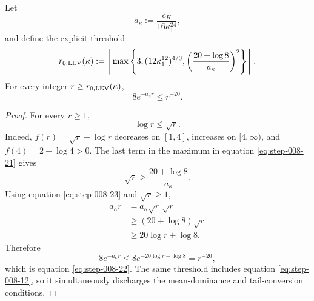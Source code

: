 \begin{lemma}
\label{lem:step-008-tail-conversion}
Let
\begin{equation}
  a_\kappa:=\frac{c_H}{16\kappa_1^{24}},                   \label{eq:step-008-20}
\end{equation}
and define the explicit threshold
\begin{equation}
  r_{0,\rm LEV}(\kappa)
  :=\left\lceil
    \max\left\{
      3,
      (12\kappa_1^{12})^{4/3},
      \left(\frac{20+\log8}{a_\kappa}\right)^2
    \right\}
  \right\rceil.                                            \label{eq:step-008-21}
\end{equation}
For every integer \(r\ge r_{0,\rm LEV}(\kappa)\),
\begin{equation}
  8e^{-a_\kappa r}\le r^{-20}.                             \label{eq:step-008-22}
\end{equation}

\end{lemma}

\begin{proof}
For every \(r\ge1\),
\begin{equation}
  \log r\le\sqrt r.                                       \label{eq:step-008-23}
\end{equation}
Indeed, \(f(r)=\sqrt r-\log r\) decreases on \([1,4]\), increases on
\([4,\infty)\), and \(f(4)=2-\log4>0\). The last term in the maximum in
equation \eqref{eq:step-008-21} gives
\[
  \sqrt r\ge\frac{20+\log8}{a_\kappa}.
\]
Using equation \eqref{eq:step-008-23} and \(\sqrt r\ge1\),
\begin{equation}
\begin{aligned}
  a_\kappa r
  &=a_\kappa\sqrt r\,\sqrt r\\
  &\ge(20+\log8)\sqrt r\\
  &\ge20\log r+\log8.
\end{aligned}\label{eq:step-008-24}
\end{equation}
Therefore
\[
  8e^{-a_\kappa r}
  \le8e^{-20\log r-\log8}
  =r^{-20},
\]
which is equation \eqref{eq:step-008-22}. The same threshold includes equation \eqref{eq:step-008-12}, so it
simultaneously discharges the mean-dominance and tail-conversion conditions.


\end{proof}

